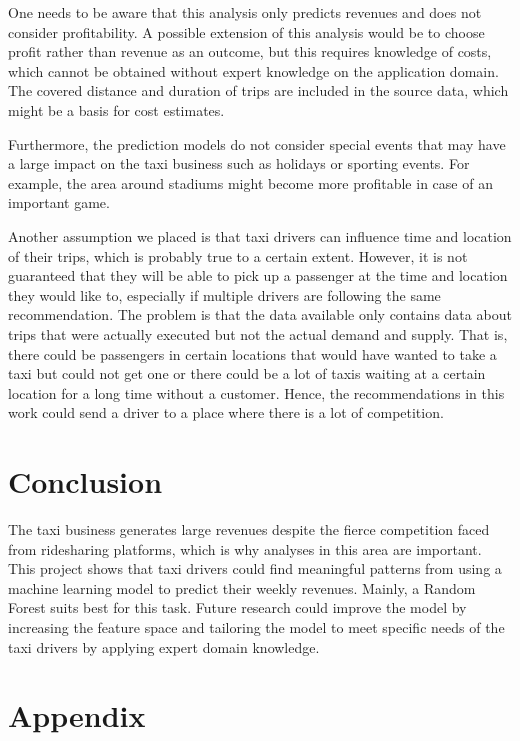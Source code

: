 \documentclass[twoside,11pt]{article}
\begin{document}
One needs to be aware that this analysis only predicts revenues and does not consider profitability. A possible extension of this analysis would be to choose profit rather than revenue as an outcome, but this requires knowledge of costs, which cannot be obtained without expert knowledge on the application domain. The covered distance and duration of trips are included in the source data, which might be a basis for cost estimates.\par

Furthermore, the prediction models do not consider special events that may have a large impact on the taxi business such as holidays or sporting events. For example, the area around stadiums might become more profitable in case of an important game.\par

Another assumption we placed is that taxi drivers can influence time and location of their trips, which is probably true to a certain extent. However, it is not guaranteed that they will be able to pick up a passenger at the time and location they would like to, especially if multiple drivers are following the same recommendation. The problem is that the data available only contains data about trips that were actually executed but not the actual demand and supply. That is, there could be passengers in certain locations that would have wanted to take a taxi but could not get one or there could be a lot of taxis waiting at a certain location for a long time without a customer. Hence, the recommendations in this work could send a driver to a place where there is a lot of competition.

\section{Conclusion}

The taxi business generates large revenues despite the fierce competition faced from ridesharing platforms, which is why analyses in this area are important. This project shows that taxi drivers could find meaningful patterns from using a machine learning model to predict their weekly revenues. Mainly, a Random Forest suits best for this task. Future research could improve the model by increasing the feature space and tailoring the model to meet specific needs of the taxi drivers by applying expert domain knowledge.



\appendix
\section*{Appendix}
\end{document}
